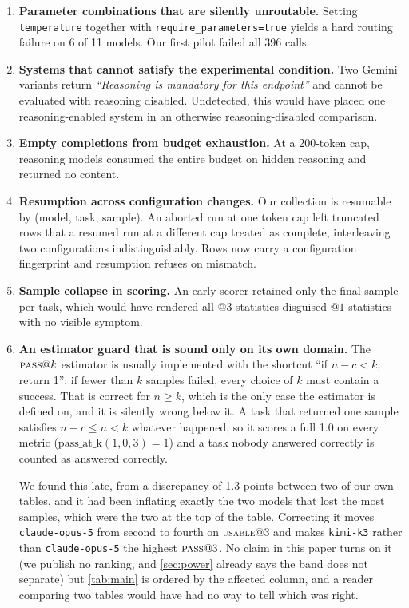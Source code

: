 \documentclass[11pt]{article}
\newcommand{\pass}{\textsc{pass}}
\newcommand{\usable}{\textsc{usable}}
\begin{document}
\begin{enumerate}
\item \textbf{Parameter combinations that are silently unroutable.} Setting
\texttt{temperature} together with \texttt{require\_parameters=true} yields a
hard routing failure on 6 of 11 models. Our first pilot failed all 396 calls.

\item \textbf{Systems that cannot satisfy the experimental condition.} Two
Gemini variants return \emph{``Reasoning is mandatory for this endpoint''}
and cannot be evaluated with reasoning disabled. Undetected, this would have
placed one reasoning-enabled system in an otherwise reasoning-disabled
comparison.

\item \textbf{Empty completions from budget exhaustion.} At a 200-token cap,
reasoning models consumed the entire budget on hidden reasoning and returned
no content.

\item \textbf{Resumption across configuration changes.} Our collection is
resumable by (model, task, sample). An aborted run at one token cap left
truncated rows that a resumed run at a different cap treated as complete,
interleaving two configurations indistinguishably. Rows now carry a
configuration fingerprint and resumption refuses on mismatch.

\item \textbf{Sample collapse in scoring.} An early scorer retained only the
final sample per task, which would have rendered all $@3$ statistics
disguised $@1$ statistics with no visible symptom.

\item \textbf{An estimator guard that is sound only on its own domain.} The
$\pass{}@k$ estimator is usually implemented with the shortcut ``if
$n - c < k$, return 1'': if fewer than $k$ samples failed, every choice of $k$
must contain a success. That is correct for $n \geq k$, which is the only case
the estimator is defined on, and it is silently wrong below it. A task that
returned one sample satisfies $n - c \leq n < k$ whatever happened, so it
scores a full 1.0 on every metric ($\mathrm{pass\_at\_k}(1, 0, 3) = 1$) and a
task nobody answered correctly is counted as answered correctly.

We found this late, from a discrepancy of 1.3 points between two of our own
tables, and it had been inflating exactly the two models that lost the most
samples, which were the two at the top of the table. Correcting it moves
\texttt{claude-opus-5} from second to fourth on \usable{}@3 and makes
\texttt{kimi-k3} rather than \texttt{claude-opus-5} the highest $\pass{}@3$.
No claim in this paper turns on it (we publish no ranking, and
\cref{sec:power} already says the band does not separate) but
\cref{tab:main} is ordered by the affected column, and a reader comparing two
tables would have had no way to tell which was right.


\end{enumerate}
\end{document}
